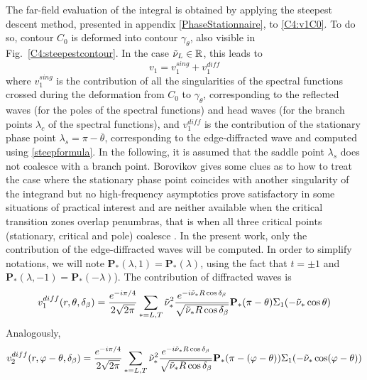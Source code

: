 The far-field evaluation of the integral is obtained by applying the steepest descent method, presented in appendix \ref{PhaseStationnaire}, to \eqref{C4:v1C0}. To do so, contour $C_0$ is deformed into contour $\gamma_{\theta}$, also visible in Fig.~\ref{C4:steepestcontour}. In the case $\tilde{\nu}_L \in \mathbb{R}$, this leads to
\begin{equation}
v_1=v_1^{sing}+v_1^{diff}
\end{equation}
where $v_1^{sing}$ is the contribution of all the singularities of the spectral functions crossed during the deformation from $C_0$ to $\gamma_{\theta}$, corresponding to the reflected waves (for the poles of the spectral functions) and head waves (for the branch points $\lambda_c$ of the spectral functions), and $v_1^{diff}$ is the contribution of the stationary phase point $\lambda_s=\pi-\overline{\theta}$, corresponding to the edge-diffracted wave and computed using \eqref{steepformula}. In the following, it is assumed that the saddle point $\lambda_s$ does not coalesce with a branch point. Borovikov \cite{Borovikov} gives some clues as to how to treat the case where the stationary phase point coincides with another singularity of the integrand but no high-frequency asymptotics prove satisfactory in some situations of practical interest \cite{Gridin} and are neither available when the critical transition zones overlap penumbras, that is when all three critical points (stationary, critical and pole) coalesce \cite{KamotskiCrit}. In the present work, only the contribution of the edge-diffracted waves will be computed. In order to simplify notations, we will note $\mathbf{P}_*(\lambda,1)=\mathbf{P}_*(\lambda)$, using the fact that $t=\pm 1$ and $\mathbf{P}_*(\lambda,-1)=\mathbf{P}_*(-\lambda)$). The contribution of diffracted waves is 
\begin{equation}
v_1^{diff}(r,\theta,\delta_{\beta})=\frac{e^{-i\pi/4}}{2\sqrt{2\pi}}\sum_{*=L,T}\tilde{\nu}_*^2\frac{e^{-i\tilde{\nu}_*R\cos\delta_{\beta}}}{\sqrt{\tilde{\nu}_*R\cos\delta_{\beta}}}\mathbf{P_*}(\pi-\theta)\Sigma_1(-\tilde{\nu}_*\cos\theta)
\end{equation}
Analogously,
\begin{equation}
v_2^{diff}(r,\varphi-\theta,\delta_{\beta})=\frac{e^{-i\pi/4}}{2\sqrt{2\pi}}\sum_{*=L,T}\tilde{\nu}_*^2\frac{e^{-i\tilde{\nu}_*R\cos\delta_{\beta}}}{\sqrt{\tilde{\nu}_*R\cos\delta_{\beta}}}\mathbf{P_*}(\pi-(\varphi-\theta))\Sigma_1(-\tilde{\nu}_*\cos(\varphi-\theta))
\end{equation}

